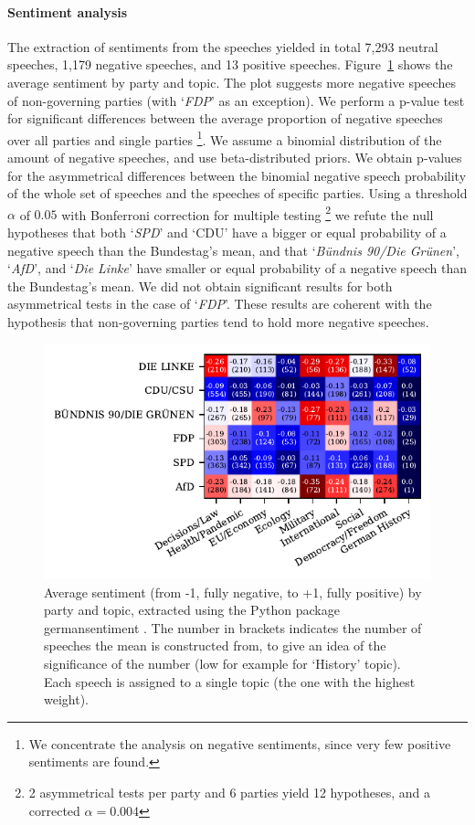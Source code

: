 \documentclass{article}
\begin{document}
\paragraph{Sentiment analysis}
The extraction of sentiments from the speeches yielded in total 7,293 neutral speeches, 1,179 negative speeches, and 13 positive speeches.
Figure~\ref{sentiments_plot} shows the average sentiment by party and topic.
The plot suggests more negative speeches of non-governing parties (with `\textit{FDP}' as an exception).
We perform a p-value test for significant differences between the average proportion of negative speeches over all parties and single parties
\footnote{We concentrate the analysis on negative sentiments, since very few positive sentiments are found.}.
We assume a binomial distribution of the amount of negative speeches, and use beta-distributed priors.
We obtain p-values for the asymmetrical differences between the binomial negative speech probability of the whole set of speeches and the speeches of specific parties.
Using a threshold $\alpha$ of $0.05$ with Bonferroni correction for multiple testing
\footnote{2 asymmetrical tests per party and 6 parties yield 12 hypotheses, and a corrected $\alpha=0.004$}
we refute the null hypotheses that both `\textit{SPD}' and `CDU' have a bigger or equal probability of a negative speech than the Bundestag's mean,
and that `\textit{Bündnis 90/Die Grünen}', `\textit{AfD}', and `\textit{Die Linke}' have smaller or equal probability of a negative speech than the Bundestag's mean.
We did not obtain significant results for both asymmetrical tests in the case of `\textit{FDP}'.
These results are coherent with the hypothesis that non-governing parties tend to hold more negative speeches.

\begin{figure}
  \centering
  \includegraphics[width=0.9\linewidth]{images/sentiments_confusion.pdf}
  \captionsetup{width=0.9\linewidth}
  \caption{
    Average sentiment (from -1, fully negative, to +1, fully positive) by party and topic, extracted using the Python package germansentiment \cite{Germansentiment}.
    The number in brackets indicates the number of speeches the mean is constructed from, to give an idea of the significance of the number (low for example for `History' topic).
    Each speech is assigned to a single topic (the one with the highest weight).
  }
  \label{sentiments_plot}
\end{figure}
\end{document}
